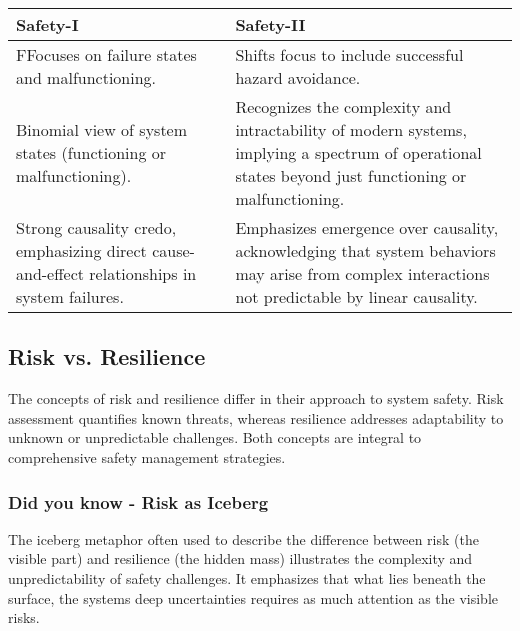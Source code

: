 \begin{tabularx}{\textwidth}{X X}
\toprule
\textbf{Safety-I} & \textbf{Safety-II} \\
\midrule
FFocuses on failure states and malfunctioning. & Shifts focus to include successful hazard avoidance. \\
Binomial view of system states (functioning or malfunctioning). & Recognizes the complexity and intractability of modern systems, implying a spectrum of operational states beyond just functioning or malfunctioning. \\
Strong causality credo, emphasizing direct cause-and-effect relationships in system failures. & Emphasizes emergence over causality, acknowledging that system behaviors may arise from complex interactions not predictable by linear causality. \\
\bottomrule
\end{tabularx}

\subsection*{Risk vs. Resilience}

The concepts of risk and resilience differ in their approach to system safety. Risk assessment quantifies known threats, whereas resilience addresses adaptability to unknown or unpredictable challenges. Both concepts are integral to comprehensive safety management strategies.

\subsubsection*{Did you know - Risk as Iceberg}
\begin{mdframed}[backgroundcolor=gray!20] 
    The iceberg metaphor often used to describe the difference between risk (the visible part) and resilience (the hidden mass) illustrates the complexity and unpredictability of safety challenges. It emphasizes that what lies beneath the surface, the systems deep uncertainties requires as much attention as the visible risks.
\end{mdframed}

